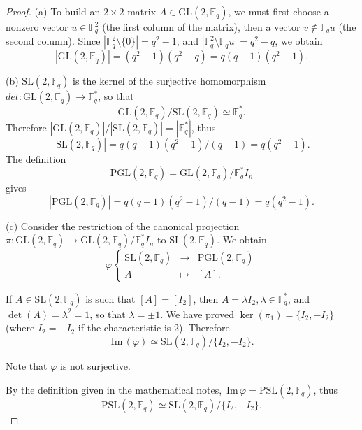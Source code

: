 \documentclass[11pt,a4paper]{article}
\newcommand{\F}{\mathbb{F}}
\newcommand{\im}{\,\mathrm{Im}\,}
\begin{document}
  \begin{proof}
  \item[(a)] To build an $2\times 2$ matrix $A \in \mathrm{GL}(2,\F_q)$, we must first choose a nonzero vector $u \in \F_q^2$ (the first column of the matrix), then a vector $v \not \in \F_q u$ (the second column). Since $|\F_q^2 \setminus \{0\}| = q^2-1$, and $|\F_q^2 \setminus \F_q u| = q^2 -q$, we obtain
  $$|\mathrm{GL}(2,\F_q)| = (q^2 - 1)(q^2 -q) =q(q-1)(q^2 - 1).$$
  
  \item[(b)] $\mathrm{SL}(2,\F_q)$ is the kernel of the surjective homomorphism $det : \mathrm{GL}(2,\F_q) \to \F_q^*$, so that
  $$\mathrm{GL}(2,\F_q)/ \mathrm{SL}(2,\F_q) \simeq \F_q^*.$$
  Therefore $|\mathrm{GL}(2,\F_q)|/| \mathrm{SL}(2,\F_q)| = |\F_q^*|$, thus
  $$| \mathrm{SL}(2,\F_q)| = q(q-1)(q^2 - 1)/(q-1) = q(q^2-1).$$
  The definition
  $$\mathrm{PGL}(2,\F_q) = \mathrm{GL}(2,\F_q)/\F_q^* I_n$$
  gives
  $$|\mathrm{PGL}(2,\F_q)| = q(q-1)(q^2 - 1)/ (q-1) = q(q^2-1).$$
  \item[(c)] Consider the restriction of the canonical projection $\pi : \mathrm{GL}(2,\F_q) \to \mathrm{GL}(2,\F_q)/\F_q^* I_n$ to $\mathrm{SL}(2,\F_q)$. We obtain
  $$
  \varphi
  \left\{
  \begin{array}{ccc}
  \mathrm{SL}(2,\F_q) & \to & \mathrm{PGL}(2,\F_q)\\
  A & \mapsto & [A].
  \end{array}
  \right.
  $$
  
  If $A \in   \mathrm{SL}(2,\F_q) $ is such that $[A] = [I_2]$, then $A = \lambda I_2, \lambda \in \F_q^*$, and $\det(A) = \lambda^2 = 1$, so that $\lambda = \pm 1$. We have proved $\ker(\pi_1) = \{I_2,-I_2\}$ (where $I_2 = -I_2$ if the characteristic is 2). Therefore
  $$\im(\varphi) \simeq \mathrm{SL}(2,\F_q)/\{I_2,-I_2\}.$$
  
  Note that $\varphi$ is not surjective.
  
  By the definition given in the mathematical notes, $\im \varphi = \mathrm{PSL}(2,\F_q)$, thus
  $$\mathrm{PSL}(2,\F_q) \simeq \mathrm{SL}(2,\F_q)/\{I_2,-I_2\}.$$
  

\end{proof}
\end{document}
